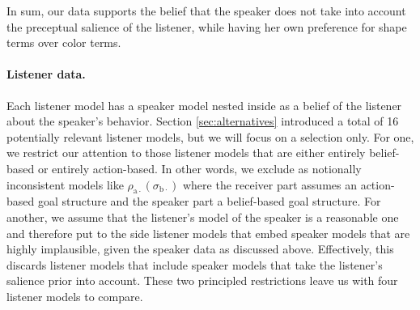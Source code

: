 \begin{figure}[htb]
  \label{fig:cost_post_s}
\end{figure}
%
In sum, our data supports the belief that the speaker does not take
into account the preceptual salience of the listener, while having her
own preference for shape terms over color terms.


\paragraph{Listener data.} Each listener model has a speaker model
nested inside as a belief of the listener about the speaker's
behavior. Section \ref{sec:alternatives} introduced a total of 16
potentially relevant listener models, but we will focus on a selection
only. For one, we restrict our attention to those listener models that
are either entirely belief-based or entirely action-based. In other
words, we exclude as notionally inconsistent models like
$\rho_{\mathrm{a}\cdot}(\sigma_{\mathrm{b}\cdot})$ where the receiver
part assumes an action-based goal structure and the speaker part a
belief-based goal structure. For another, we assume that the
listener's model of the speaker is a reasonable one and therefore put
to the side listener models that embed speaker models that are highly
implausible, given the speaker data as discussed above. Effectively,
this discards listener models that include speaker models that take
the listener's salience prior into account. These two principled
restrictions leave us with four listener models to compare.

